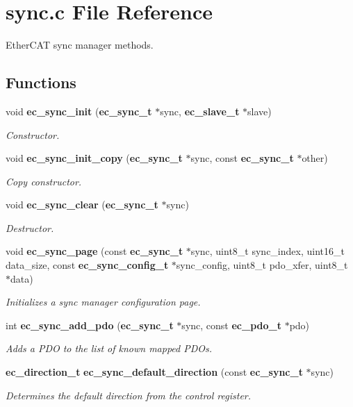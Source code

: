 \section{sync.\-c File Reference}
\label{sync_8c}


Ether\-C\-A\-T sync manager methods.  


\subsection*{Functions}
\begin{DoxyCompactItemize}
\item 
void {\bf ec\-\_\-sync\-\_\-init} ({\bf ec\-\_\-sync\-\_\-t} $\ast$sync, {\bf ec\-\_\-slave\-\_\-t} $\ast$slave)
\begin{DoxyCompactList}\small\item\em Constructor. \end{DoxyCompactList}\item 
void {\bf ec\-\_\-sync\-\_\-init\-\_\-copy} ({\bf ec\-\_\-sync\-\_\-t} $\ast$sync, const {\bf ec\-\_\-sync\-\_\-t} $\ast$other)
\begin{DoxyCompactList}\small\item\em Copy constructor. \end{DoxyCompactList}\item 
void {\bf ec\-\_\-sync\-\_\-clear} ({\bf ec\-\_\-sync\-\_\-t} $\ast$sync)
\begin{DoxyCompactList}\small\item\em Destructor. \end{DoxyCompactList}\item 
void {\bf ec\-\_\-sync\-\_\-page} (const {\bf ec\-\_\-sync\-\_\-t} $\ast$sync, uint8\-\_\-t sync\-\_\-index, uint16\-\_\-t data\-\_\-size, const {\bf ec\-\_\-sync\-\_\-config\-\_\-t} $\ast$sync\-\_\-config, uint8\-\_\-t pdo\-\_\-xfer, uint8\-\_\-t $\ast$data)
\begin{DoxyCompactList}\small\item\em Initializes a sync manager configuration page. \end{DoxyCompactList}\item 
int {\bf ec\-\_\-sync\-\_\-add\-\_\-pdo} ({\bf ec\-\_\-sync\-\_\-t} $\ast$sync, const {\bf ec\-\_\-pdo\-\_\-t} $\ast$pdo)
\begin{DoxyCompactList}\small\item\em Adds a P\-D\-O to the list of known mapped P\-D\-Os. \end{DoxyCompactList}\item 
{\bf ec\-\_\-direction\-\_\-t} {\bf ec\-\_\-sync\-\_\-default\-\_\-direction} (const {\bf ec\-\_\-sync\-\_\-t} $\ast$sync)
\begin{DoxyCompactList}\small\item\em Determines the default direction from the control register. \end{DoxyCompactList}\end{DoxyCompactItemize}



